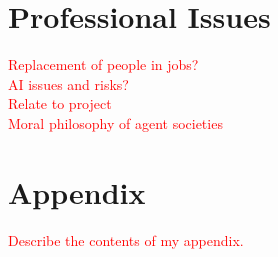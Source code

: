 \documentclass[]{final_report}
\begin{document}
\newpage
{}

\label{endpage}

\chapter{Professional Issues}
\textcolor{red}{Replacement of people in jobs?\\
AI issues and risks?\\
Relate to project\\
Moral philosophy of agent societies}

\chapter{Appendix}
\label{appendix}
\textcolor{red}{Describe the contents of my appendix.}

%

%

%

%	
	
\end{document}
